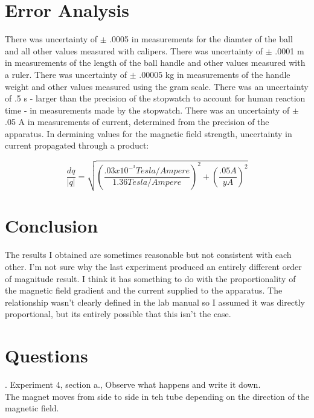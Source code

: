 \documentclass[12pt]{article}
\begin{document}
\section{Error Analysis}
\indent \indent There was uncertainty of $\pm$ .0005 in measurements for the diamter of the ball and all other values measured with calipers. There was uncertainty of $\pm$ .0001 m in measurements of the length of the ball handle and other values measured with a ruler. There was uncertainty of $\pm$ .00005 kg in measurements of the handle weight and other values measured using the gram scale. There was an uncertainty of .5 s - larger than the precision of the stopwatch to account for human reaction time - in measurements made by the stopwatch. There was an uncertainty of $\pm$ .05 A in measurements of current, determined from the precision of the apparatus. In dermining values for the magnetic field strength, uncertainty in current propagated through a product:

\[ \frac{dq}{|q|} = \sqrt{(\frac{.03 x 10^-^3 Tesla/Ampere}{1.36 Tesla/Ampere})^2 + (\frac{.05 A}{y A})^2} \]


\section{Conclusion}
\indent \indent The results I obtained are sometimes reasonable but not consistent with each other. I'm not sure why the last experiment produced an entirely different order of magnitude result. I think it has something to do with the proportionality of the magnetic field gradient and the current supplied to the apparatus. The relationship wasn't clearly defined in the lab manual so I assumed it was directly proportional, but its entirely possible that this isn't the case.

\section{Questions}
\indent {}. Experiment 4, section a., Observe what happens and write it down. \\
\indent The magnet moves from side to side in teh tube depending on the direction of the magnetic field.
\end{document}
